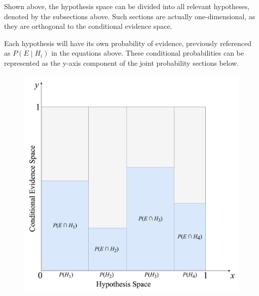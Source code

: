 \documentclass[12pt]{article}
\begin{document}
\noindent Shown above, the hypothesis space can be divided into all relevant hypotheses, denoted by the subsections above. Such sections are actually one-dimensional, as they are orthogonal to the conditional evidence space.

\newpage

\noindent Each hypothesis will have its own probability of evidence, previously referenced as $P(E \mid H_i)$ in the equations above. These conditional probabilities can be represented as the y-axis component of the joint probability sections below.

\begin{figure}[h!]
    \centering
    \begin{minipage}{0.72\textwidth}
        \centering
        \includegraphics[width=\textwidth]{assets/visual_5.png}
    \end{minipage}\hfill
    \begin{minipage}{0.28\textwidth}
        \centering

\end{minipage}
\end{figure}
\end{document}
